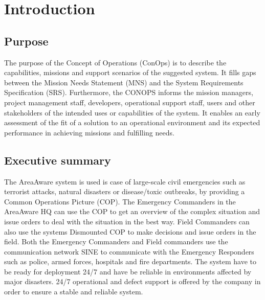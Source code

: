 \chapter{Introduction}
\label{chp_intro}

\section{Purpose}
The purpose of the Concept of Operations (ConOps) is to describe the capabilities, missions and support scenarios of the suggested system. It fills gaps between the Mission Needs Statement (MNS) and the System Requirements Specification (SRS).
Furthermore, the CONOPS informs the mission managers, project management staff, developers, operational support staff, users and other stakeholders of the intended uses or capabilities of the system. It enables an early assessment of the fit of a solution to an operational environment and its expected performance in achieving missions and fulfilling needs.

\section{Executive summary}
The AreaAware system is used is case of large-scale civil emergencies such as terrorist attacks, natural disasters or disease/toxic outbreaks, by providing a Common Operations Picture (COP). The Emergency Commanders in the AreaAware HQ can use the COP to get an overview of the complex situation and issue orders to deal with the situation in the best way. Field Commanders can also use the systems Dismounted COP to make decisions and issue orders in the field. Both the Emergency Commanders and Field commanders use the communication network SINE to communicate with the Emergency Responders such as police, armed forces, hospitals and fire departments. The system have to be ready for deployment 24/7 and have be reliable in environments affected by major disasters. 24/7 operational and defect support is offered by the company in order to ensure a stable and reliable system.



